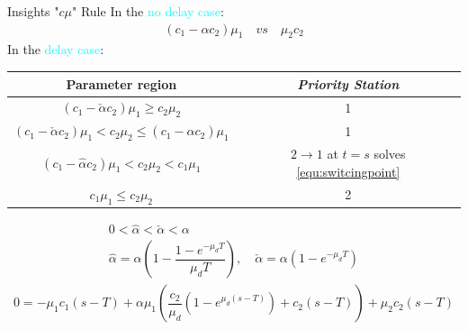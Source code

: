 \documentclass[smaller ,table,usenames,dvipsnames]{beamer}
\newcommand{\?}{\stackrel{?}{=}}
\begin{document}
\begin{frame}{Insights "$c\mu$" Rule}
In the \textcolor{Cyan}{no delay case}:
\begin{align*}
    (c_1-\alpha c_2)\mu_1 \quad vs\quad \mu_2 c_2
\end{align*}
In the \textcolor{Cyan}{delay case}:
\begin{table}[h!]
\centering
\begin{tabular}{|c|c|}
	\toprule \hline
	Parameter region &{\emph{Priority Station}} 	\\\hline
	$(c_1- \check{\alpha} c_2)\mu_1  \geq c_2\mu_2$ &{1}\\\hline
	$(c_1-\check{\alpha}c_2)\mu_1 <c_2\mu_2 \leq  (c_1-\hat{\alpha}c_2)\mu_1 $ & 1 \\ \hline
	$ (c_1-\hat{\alpha}c_2)\mu_1<c_2\mu_2<c_1\mu_1$ & $ 2\rightarrow1 $ at $ t=s $ solves \eqref{equ:switcingpoint}\\\hline
	$ c_1\mu_1\leq c_2\mu_2$&2\\\bottomrule
\end{tabular}
\vspace{0.1in}
\label{table:}
\end{table}
\vspace{-0.2in}
\begin{gather*}
0< \hat{\alpha} < \check{\alpha}<\alpha\\
    \hat{\alpha}=\alpha(1-\dfrac{1-e^{-\mu_dT}}{\mu_d T}),\quad \check{\alpha}=\alpha(1-e^{-\mu_d T})
\end{gather*}
\vspace{-0.1in}
\small
\begin{equation}\label{equ:switcingpoint}
\begin{array}{l}
0=-\mu_1c_1(s-T)+\alpha\mu_1\left(\dfrac{c_2}{\mu_d}(1-e^{\mu_d(s-T)})+c_2(s-T)\right)+\mu_2c_2(s-T)
\end{array}
\end{equation}
\end{frame}
\end{document}
